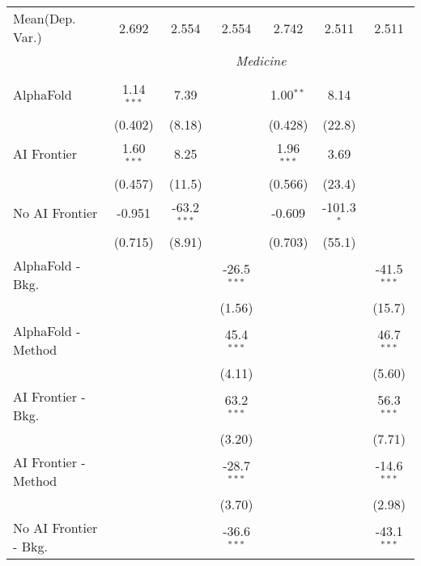 \begin{tabular}{lcccccc}
Mean(Dep. Var.) & 2.692 & 2.554 & 2.554 & 2.742 & 2.511 & 2.511 \\
 & \multicolumn{6}{c}{\textit{Medicine}} \\ \\
   AlphaFold               & 1.14$^{***}$ & 7.39          &               & 1.00$^{**}$  & 8.14         &   \\   
                           & (0.402)      & (8.18)        &               & (0.428)      & (22.8)       &   \\   
   AI Frontier             & 1.60$^{***}$ & 8.25          &               & 1.96$^{***}$ & 3.69         &   \\   
                           & (0.457)      & (11.5)        &               & (0.566)      & (23.4)       &   \\   
   No AI Frontier          & -0.951       & -63.2$^{***}$ &               & -0.609       & -101.3$^{*}$ &   \\   
                           & (0.715)      & (8.91)        &               & (0.703)      & (55.1)       &   \\   
   AlphaFold - Bkg.        &              &               & -26.5$^{***}$ &              &              & -41.5$^{***}$\\   
                           &              &               & (1.56)        &              &              & (15.7)\\   
   AlphaFold - Method      &              &               & 45.4$^{***}$  &              &              & 46.7$^{***}$\\   
                           &              &               & (4.11)        &              &              & (5.60)\\   
   AI Frontier - Bkg.      &              &               & 63.2$^{***}$  &              &              & 56.3$^{***}$\\   
                           &              &               & (3.20)        &              &              & (7.71)\\   
   AI Frontier - Method    &              &               & -28.7$^{***}$ &              &              & -14.6$^{***}$\\   
                           &              &               & (3.70)        &              &              & (2.98)\\   
   No AI Frontier - Bkg.   &              &               & -36.6$^{***}$ &              &              & -43.1$^{***}$\\   

\end{tabular}
